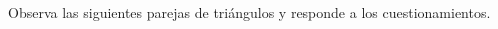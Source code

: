 \question[10] Observa las siguientes parejas de tri\'angulos y responde a los cuestionamientos.

\begin{multicols}{2}
\begin{parts}
    
    
    
    
\end{parts}
\end{multicols}